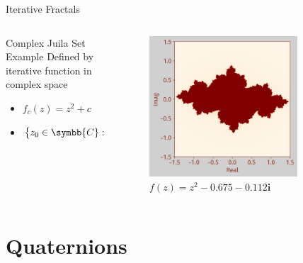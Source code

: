 \documentclass[aspectratio=169,t]{beamer}
\DeclarePairedDelimiter\abs{\lvert}{\rvert} %
\begin{document}
\begin{frame}[label={sec:org1678e50}]{Iterative Fractals}
\begin{columns}
\begin{column}{0.55\columnwidth}
\begin{block}{Complex Juila Set Example}
Defined by iterative function in complex space

\begin{itemize}
\item \(f_c (z) = z^2 + c\)

\item \(\left\{ z_0 \in \symbb{C}: \abs{f^k_c \left(z_0 \right)} > B \text{ as } k \to \infty\right\} \in K_c\)
\end{itemize}
\end{block}
\end{column}

\begin{column}{0.45\columnwidth}
\begin{figure}[htbp]
\centering
\includegraphics[width=0.80\textwidth]{./Figs/Fig_2v2.png}
\caption{\(f(z) = z^2 -0.675 - 0.112\symbf{i}\)}
\end{figure}
\end{column}
\end{columns}
\end{frame}

\section{Quaternions}
\label{sec:org2fa9243}
\end{document}
